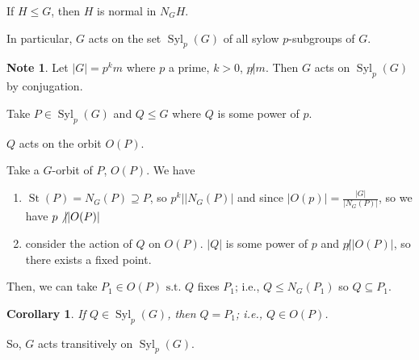 \documentclass{amsart}
\newtheorem{cor}[thm]{Corollary}
\theoremstyle{definition}
\newtheorem{note}[thm]{Note}
\newcommand{\st}{\text{ s.t. }}
\DeclareMathOperator{\St}{St}
\DeclareMathOperator{\Syl}{Syl}
\begin{document}
If $H\leq G$, then $H$ is normal in $N_G{H}$.

In particular, $G$ acts on the set $\Syl_p(G)$ of all sylow $p$-subgroups of $G$.

\begin{note}
	Let $|G|=p^km$ where $p$ a prime, $k>0$, $p\not|m$. Then $G$ acts on $\Syl_p(G)$ by conjugation.
	
	Take $P\in \Syl_p(G)$ and $Q\leq G$ where $Q$ is some power of $p$.
	
	$Q$ acts on the orbit $O(P)$.
	
	Take a $G$-orbit of $P$, $O(P)$. We have
	\begin{enumerate}
		\item $\St(P)=N_G(P)\supseteq P$, so $p^k||N_G(P)|$ and since $|O(p)|=\frac{|G|}{|N_G(P)|}$, so we have $p\not\vert |O(P)|$
		\item consider the action of $Q$ on $O(P)$. $|Q|$ is some power of $p$ and $p\not||O(P)|$, so there exists a fixed point.
	\end{enumerate}
	
	Then, we can take $P_1\in O(P)\st Q$ fixes $P_1$; i.e., $Q\leq N_G(P_1)$ so $Q\subseteq P_1$.
\end{note}
\begin{cor}
	If $Q\in\Syl_p(G)$, then $Q=P_1$; i.e., $Q\in O(P)$.
\end{cor}

So, $G$ acts transitively on $\Syl_p(G)$.
\end{document}
